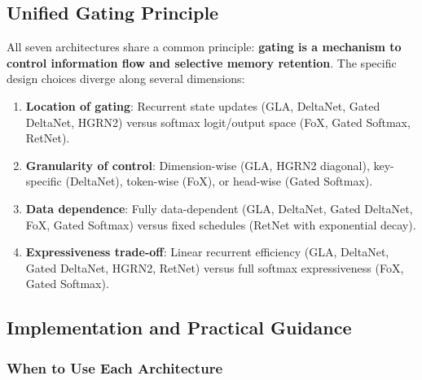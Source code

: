 \documentclass[11pt,a4paper]{article}
\begin{document}
\subsection{Unified Gating Principle}

All seven architectures share a common principle: \textbf{gating is a mechanism to control information flow and selective memory retention}. The specific design choices diverge along several dimensions:

\begin{enumerate}[leftmargin=*]
    \item \textbf{Location of gating}: Recurrent state updates (GLA, DeltaNet, Gated DeltaNet, HGRN2) versus softmax logit/output space (FoX, Gated Softmax, RetNet).
    \item \textbf{Granularity of control}: Dimension-wise (GLA, HGRN2 diagonal), key-specific (DeltaNet), token-wise (FoX), or head-wise (Gated Softmax).
    \item \textbf{Data dependence}: Fully data-dependent (GLA, DeltaNet, Gated DeltaNet, FoX, Gated Softmax) versus fixed schedules (RetNet with exponential decay).
    \item \textbf{Expressiveness trade-off}: Linear recurrent efficiency (GLA, DeltaNet, Gated DeltaNet, HGRN2, RetNet) versus full softmax expressiveness (FoX, Gated Softmax).
\end{enumerate}

\subsection{Implementation and Practical Guidance}

\subsubsection{When to Use Each Architecture}
\end{document}
